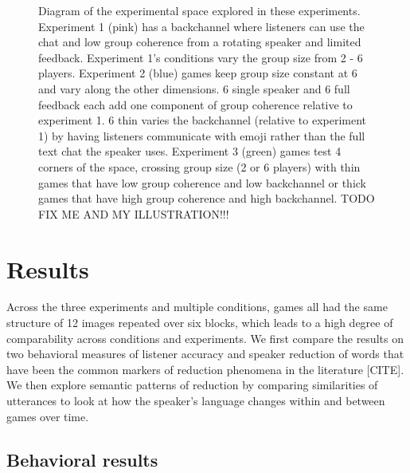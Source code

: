 \documentclass[
  english,
  a4paper,
]{article}
\begin{document}
\begin{figure}
    
    \caption{ Diagram of the experimental space explored in these experiments. Experiment 1 (pink) has a backchannel where listeners can use the chat and low group coherence from a rotating speaker and limited feedback. Experiment 1's conditions vary the group size from 2 - 6 players. Experiment 2 (blue) games keep group size constant at 6 and vary along the other dimensions. 6 single speaker and 6 full feedback each add one component of group coherence relative to experiment 1. 6 thin varies the backchannel (relative to experiment 1) by having listeners communicate with emoji rather than the full text chat the speaker uses. Experiment 3 (green) games test 4 corners of the space, crossing group size (2 or 6 players) with thin games that have low group coherence and low backchannel or thick games that have high group coherence and high backchannel. TODO FIX ME AND MY ILLUSTRATION!!! }
    \label{diagram}
\end{figure}

\hypertarget{results}{%
\section{Results}\label{results}}

Across the three experiments and multiple conditions, games all had the same structure of 12 images repeated over six blocks, which leads to a high degree of comparability across conditions and experiments. We first compare the results on two behavioral measures of listener accuracy and speaker reduction of words that have been the common markers of reduction phenomena in the literature {[}CITE{]}. We then explore semantic patterns of reduction by comparing similarities of utterances to look at how the speaker's language changes within and between games over time.

\hypertarget{behavioral-results}{%
\subsection{Behavioral results}\label{behavioral-results}}
\end{document}
